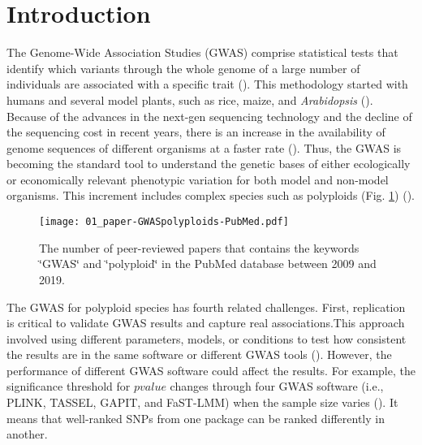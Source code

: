 \documentclass{article}
\begin{document}
\section{Introduction}
The Genome-Wide Association Studies (GWAS) comprise statistical tests that identify which variants through the whole genome of a large number of individuals are associated with a specific trait (\cite{cantor2010prioritizing,begum2012comprehensive}). This methodology started with humans and several model plants, such as rice, maize, and \emph{Arabidopsis} (\cite{lauc2010genomics,tian2011genome,cao2011whole,korte2013advantages,han2013sequencing}). Because of the advances in the next-gen sequencing technology and the decline of the sequencing cost in recent years, there is an increase in the availability of genome sequences of different organisms at a faster rate (\cite{ekblom2011applications,ellegren2014genome}). Thus, the GWAS is becoming the standard tool to understand the genetic bases of either ecologically or economically relevant phenotypic variation for both model and non-model organisms. This increment includes complex species such as polyploids (Fig. \ref{GWASpolyploids}) (\cite{ekblom2011applications,santure2018wild}).

\begin{figure}[H]
\begin{centering}
\texttt{[image: 01\_paper-GWASpolyploids-PubMed.pdf]}
\par\end{centering}
\caption{The number of peer-reviewed papers that contains the keywords \char`\"{}GWAS\char`\"{} and \char`\"{}polyploid\char`\"{} in the PubMed database between 2009 and 2019.\label{GWASpolyploids}}
\end{figure}

The GWAS for polyploid species has fourth related challenges. First, replication is critical to validate GWAS results and capture real associations.This approach involved using different parameters, models, or conditions to test how consistent the results are in the same software or different GWAS tools (\cite{De2014,Pearson2008}). However, the performance of different GWAS software could affect the results. For example, the significance threshold for $pvalue$ changes through four GWAS software (i.e., PLINK, TASSEL, GAPIT, and FaST-LMM) when the sample size varies (\cite{Yan2019}). It means that well-ranked SNPs from one package can be ranked differently in another.
\end{document}
